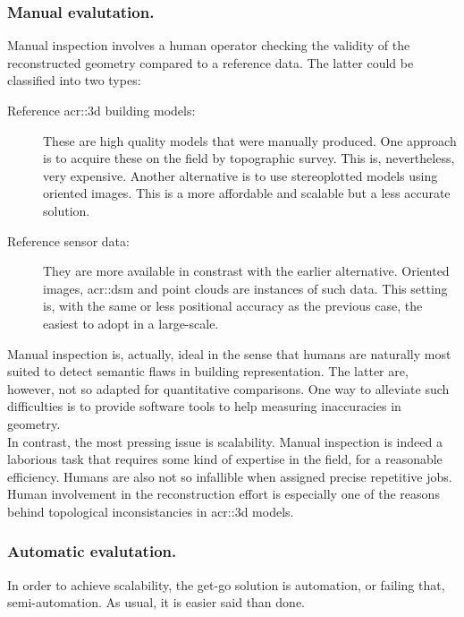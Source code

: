         \subsubsection{Manual evalutation.}
            Manual inspection involves a human operator checking the validity of the reconstructed geometry compared to a reference data.
            The latter could be classified into two types:
            \begin{description}
                \item[Reference \gls{acr::3d} building models:] These are high quality models that were manually produced.
                    One approach is to acquire these on the field by topographic survey.
                    This is, nevertheless, very expensive.
                    Another alternative is to use stereoplotted models using oriented images.
                    This is a more affordable and scalable but a less accurate solution.
                \item[Reference sensor data:] They are more available in constrast with the earlier alternative.
                    Oriented images, \gls{acr::dsm} and point clouds are instances of such data.
                    This setting is, with the same or less positional accuracy as the previous case, the easiest to adopt in a large-scale.
            \end{description}

            Manual inspection is, actually, ideal in the sense that humans are naturally most suited to detect semantic flaws in building representation.
            The latter are, however, not so adapted for quantitative comparisons.
            One way to alleviate such difficulties is to provide software tools to help measuring inaccuracies in geometry.\\

            In contrast, the most pressing issue is scalability.
            Manual inspection is indeed a laborious task that requires some kind of expertise in the field, for a reasonable efficiency.
            Humans are also not so infallible when assigned precise repetitive jobs.
            Human involvement in the reconstruction effort is especially one of the reasons behind topological inconsistancies in \gls{acr::3d} models.

        \subsubsection{Automatic evalutation.}
            In order to achieve scalability, the get-go solution is automation, or failing that, semi-automation.
            As usual, it is easier said than done.\\

